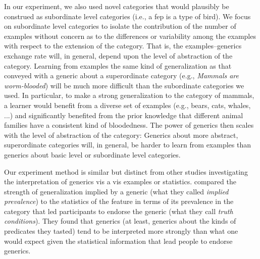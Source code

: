 \documentclass[10pt,letterpaper]{article}
\newcommand{\mht}[1]{\textcolor{Blue}{[mht: #1]}}
\begin{document}
In our experiment, we also used novel categories that would plausibly be construed as subordinate level categories (i.e., a fep is a type of bird).
We focus on subordinate level categories to isolate the contribution of the number of examples without concern as to the differences or variability among the examples with respect to the extension of the category.
That is, the examples--generics exchange  rate will, in general, depend upon the level of abstraction of the category. 
Learning from examples the same kind of generalization as that conveyed with a generic about a superordinate category (e.g., \emph{Mammals are worm-blooded}) will be much more difficult than the subordinate categories we used. 
In particular, to make a strong generalization to the category of mammals, a learner would benefit from a diverse set of examples (e.g., bears, cats, whales, ...) and significantly benefited from the prior knowledge that different animal families have a consistent kind of bloodedness. 
The power of generics then scales with the level of abstraction of the category: Generics about more abstract, superordinate categories will, in general, be harder to learn from examples than generics about basic level or subordinate level categories. 





Our experiment method is similar but distinct from other studies investigating the interpretation of generics vis a vis examples or statistics.
 compared the strength of generalization implied by a generic (what they called \emph{implied prevalence}) to the statistics of the feature in terms of its prevalence in the category that led participants to endorse the generic (what they call \emph{truth conditions}). They found that generics (at least, generics about the kinds of predicates they tasted) tend to be interpreted more strongly than what one would expect given the statistical information that lead people to endorse generics. 
\end{document}
